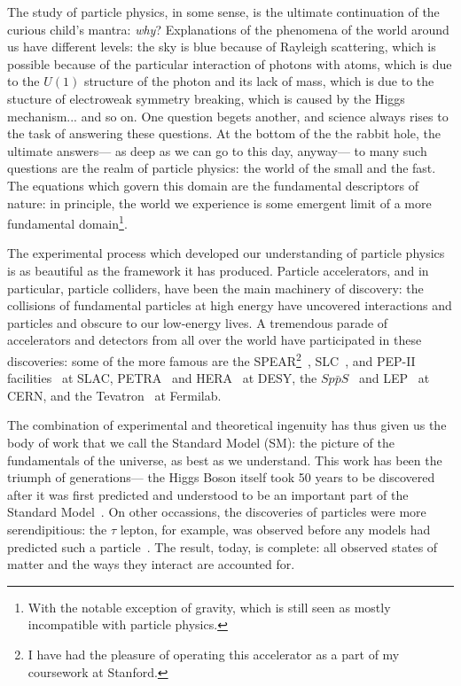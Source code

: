 \label{chapter:introduction}

The study of particle physics, in some sense, is the ultimate continuation of the curious child's mantra: \textit{why}? Explanations of the phenomena of the world around us have different levels: the sky is blue because of Rayleigh scattering, which is possible because of the particular interaction of photons with atoms, which is due to the $U(1)$ structure of the photon and its lack of mass, which is due to the stucture of electroweak symmetry breaking, which is caused by the Higgs mechanism... and so on. One question begets another, and science always rises to the task of answering these questions. At the bottom of the the rabbit hole, the ultimate answers--- as deep as we can go to this day, anyway--- to many such questions are the realm of particle physics: the world of the small and the fast. The equations which govern this domain are the fundamental descriptors of nature: in principle, the world we experience is some emergent limit of a more fundamental domain\footnote{With the notable exception of gravity, which is still seen as mostly incompatible with particle physics.}.

The experimental process which developed our understanding of particle physics is as beautiful as the framework it has produced. Particle accelerators, and in particular, particle colliders, have been the main machinery of discovery: the collisions of fundamental particles at high energy have uncovered interactions and particles and obscure to our low-energy lives. A tremendous parade of accelerators and detectors from all over the world have participated in these discoveries: some of the more famous are the SPEAR\footnote{I have had the pleasure of operating this accelerator as a part of my coursework at Stanford.}~\cite{PhysRevLett.33.1406,PhysRevLett.35.1489}, SLC~\cite{Abe:2000ey}, and PEP-II facilities~\cite{Lees:2012xj} at SLAC, PETRA~\cite{Brandelik:1979bd} and HERA~\cite{Zeus,H1Zeus} at DESY, the $Sp\bar{p}S$~\cite{Arnison:1983rp,Banner:1983jy} and LEP~\cite{LEPHiggs} at CERN, and the Tevatron~\cite{PhysRevLett.74.2626,Abachi:1995iq} at Fermilab. 

The combination of experimental and theoretical ingenuity has thus given us the body of work that we call the Standard Model (SM): the picture of the fundamentals of the universe, as best as we understand. This work has been the triumph of generations--- the Higgs Boson itself took 50 years to be discovered after it was first predicted and understood to be an important part of the Standard Model~\cite{Aad:2012tfa,Chatrchyan:2012ufa}. On other occassions, the discoveries of particles were more serendipitious: the $\tau$ lepton, for example, was observed before any models had predicted such a particle~\cite{PhysRevLett.35.1489}. The result, today, is complete: all observed states of matter and the ways they interact are accounted for.

